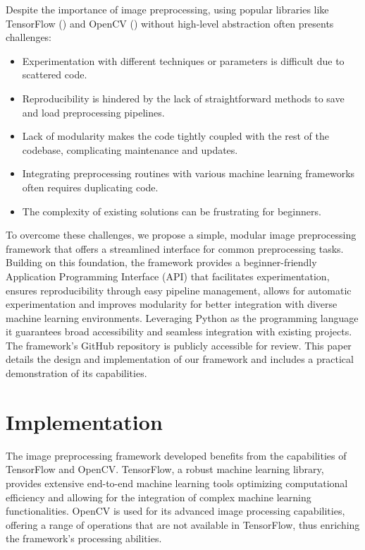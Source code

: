 \documentclass[journal]{new-aiaa}
\begin{document}
Despite the importance of image preprocessing, using popular libraries like TensorFlow (\cite{tensorflow2015}) and OpenCV (\cite{opencv2000}) without high-level abstraction often presents challenges:
\begin{itemize}
	\item Experimentation with different techniques or parameters is difficult due to scattered code.
	\item Reproducibility is hindered by the lack of straightforward methods to save and load preprocessing pipelines.
	\item Lack of modularity makes the code tightly coupled with the rest of the codebase, complicating maintenance and updates.
	\item Integrating preprocessing routines with various machine learning frameworks often requires duplicating code.
	\item The complexity of existing solutions can be frustrating for beginners.
\end{itemize}

To overcome these challenges, we propose a simple, modular image preprocessing framework that offers a streamlined interface for common preprocessing tasks. Building on this foundation, the framework provides a beginner-friendly Application Programming Interface (API) that facilitates experimentation, ensures reproducibility through easy pipeline management, allows for automatic experimentation and improves modularity for better integration with diverse machine learning environments. Leveraging Python as the programming language it guarantees broad accessibility and seamless integration with existing projects.\cite{python}\cite{pythonCV} The framework's GitHub repository is publicly accessible for review.\cite{repo2024} This paper details the design and implementation of our framework and includes a practical demonstration of its capabilities.


\section{Implementation}
The image preprocessing framework developed benefits from the capabilities of TensorFlow and OpenCV. TensorFlow, a robust machine learning library, provides extensive end-to-end machine learning tools optimizing computational efficiency and allowing for the integration of complex machine learning functionalities.\cite{tensorflowLearn} OpenCV is used for its advanced image processing capabilities, offering a range of operations that are not available in TensorFlow, thus enriching the framework's processing abilities.\cite{opencvTutorial}
\end{document}
